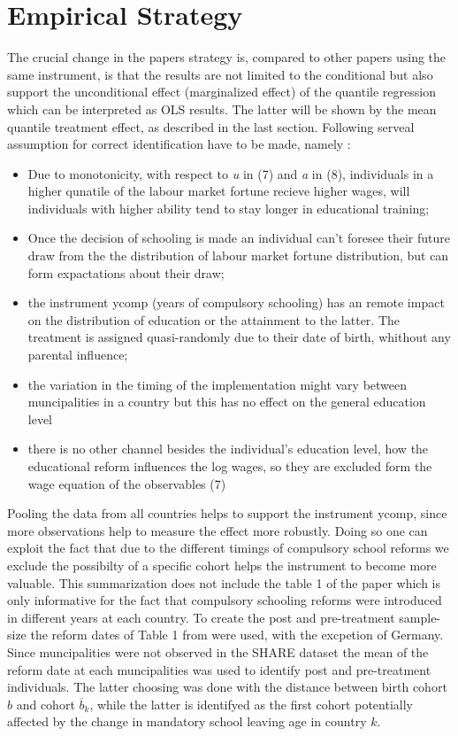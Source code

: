 \documentclass[12pt,a4paper]{article}
\begin{document}
\section{Empirical Strategy}\label{empirical-strategy}

The crucial change in the papers strategy is, compared to other papers
using the same instrument, is that the results are not limited to the
conditional but also support the unconditional effect (marginalized
effect) of the quantile regression which can be interpreted as OLS
results. The latter will be shown by the mean quantile treatment effect,
as described in the last section. Following \textcite{brunello} serveal
assumption for correct identification have to be made, namely :

\begin{itemize}
\item Due to monotonicity, with respect to \textit{u} in (7) and \textit{a} in (8), individuals in a higher qunatile of the labour market fortune recieve higher wages, will individuals with higher ability tend to stay longer in educational training;
\item Once the decision of schooling is made an individual can't foresee their future draw from the the distribution of labour market fortune distribution, but can form expactations about their draw;
\item the instrument ycomp (years of compulsory schooling) has an remote impact on the distribution of education or the attainment to the latter. The treatment is assigned quasi-randomly due to their date of birth, whithout any parental influence;
\item the variation in the timing of the implementation might vary between muncipalities in a country but this has no effect on the general education level
\item there is no other channel besides the individual's education level, how the educational reform influences the log wages, so they are excluded form the wage equation of the observables (7)
\end{itemize}

Pooling the data from all countries helps to support the instrument
ycomp, since more observations help to measure the effect more robustly.
Doing so one can exploit the fact that due to the different timings of
compulsory school reforms we exclude the possibilty of a specific cohort
helps the instrument to become more valuable. This summarization does
not include the table 1 of the paper which is only informative for the
fact that compulsory schooling reforms were introduced in different
years at each country. To create the post and pre-treatment sample-size
the reform dates of Table 1 from \textcite{brunello} were used, with the
excpetion of Germany. Since muncipalities were not observed in the SHARE
dataset the mean of the reform date at each muncipalities was used to
identify post and pre-treatment individuals. The latter choosing was
done with the distance between birth cohort \(b\) and cohort
\(\overline{b}_k\), while the latter is identifyed as the first cohort
potentially affected by the change in mandatory school leaving age in
country \(k\).
\end{document}
